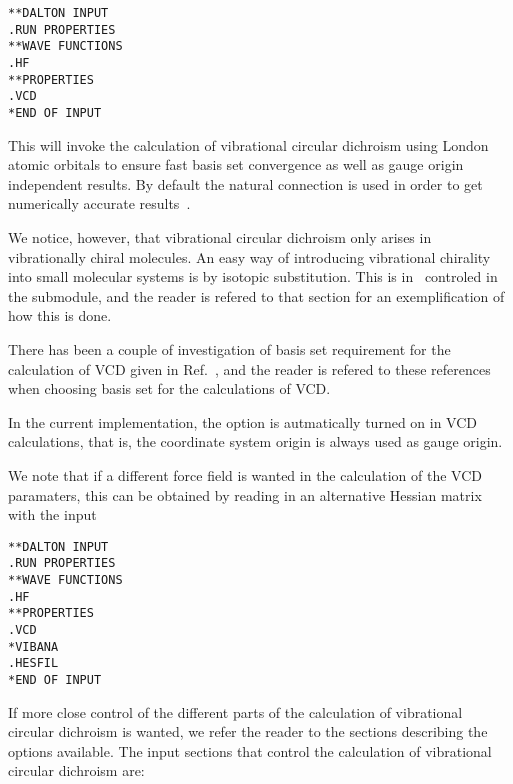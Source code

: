 \begin{verbatim}
**DALTON INPUT
.RUN PROPERTIES
**WAVE FUNCTIONS
.HF
**PROPERTIES
.VCD
*END OF INPUT
\end{verbatim}

This will invoke the calculation of vibrational circular dichroism
using London atomic orbitals to ensure fast
basis set convergence as 
well as gauge origin independent results. By
default the natural 
connection is used in order to get
numerically accurate
results~\cite{joklbkrthpjtca90,krthjopjklbcpl235}.

We notice, however, that vibrational circular dichroism only arises in
vibrationally chiral molecules. An easy way of introducing
vibrational chirality into small molecular systems is by isotopic
substitution. This is in 
\siraba\ controled in the  submodule, and the reader is
refered to that section for an exemplification of how this is done. 

There has been a couple of investigation of basis set requirement for
the calculation of VCD given in
Ref.~\cite{klbpjthkrhjajjcp100,klbpjthkrfd99}, 
and the reader is refered to these references when choosing basis set
for the calculations of VCD. 

In the current implementation, the  option is autmatically
turned on in VCD calculations, that is, the coordinate system origin
is always used as gauge origin.

We note that if a different force field is wanted in the calculation
of the VCD paramaters, this can be obtained by reading in an
alternative Hessian matrix with the input

\begin{verbatim}
**DALTON INPUT
.RUN PROPERTIES
**WAVE FUNCTIONS
.HF
**PROPERTIES
.VCD
*VIBANA
.HESFIL
*END OF INPUT
\end{verbatim}

If more close control of the different parts of the calculation of
vibrational circular dichroism is wanted, we refer the reader to the
sections describing the options available. The input sections that control
the calculation of vibrational circular dichroism are:

